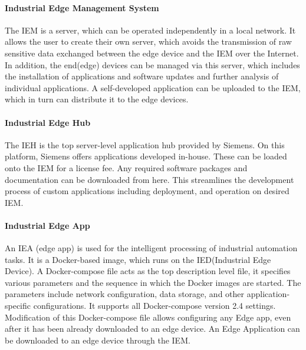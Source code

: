 			
		\paragraph{Industrial Edge Management System}
			The \gls{IEM} is a server, which can be operated independently in a local network. It allows the user to create their own server, which avoids the transmission of raw sensitive data exchanged between the edge device and the IEM over the Internet.
			In addition, the end(edge) devices can be managed via this server, which includes the installation of applications and software updates and further analysis of individual applications. A self-developed application can be uploaded to the IEM, which in turn can distribute it to the edge devices.\cite{siemensIndustrialEdge}

		\paragraph{Industrial Edge Hub}
			The \gls{IEH} 
			is the top server-level application hub provided by Siemens. On this platform, Siemens offers applications developed in-house. These can be loaded onto the IEM for a license fee. Any required software packages and documentation can be downloaded from here. This streamlines the development process of custom applications including deployment, and operation on desired IEM.\cite{siemensIndustrialEdge}

		\paragraph{Industrial Edge App}
			An \gls{IEA} (edge app) is used for the intelligent processing of industrial automation tasks.\cite{siemensIndustrialEdge} It is a Docker-based image, which runs on the IED(Industrial Edge Device). A Docker-compose file acts as the top description level file, it specifies various parameters and the sequence in which the Docker images are started. The parameters include network configuration, data storage, and other application-specific configurations. It supports all Docker-compose version 2.4 settings. Modification of this Docker-compose file allows configuring any Edge app, even after it has been already downloaded to an edge device. An Edge Application can be downloaded to an edge device through the IEM.
	
